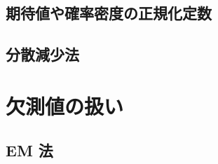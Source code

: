 \subsection{期待値や確率密度の正規化定数}

\subsection{分散減少法}

\section{欠測値の扱い}
\label{sec:stat-missing}



\subsection{EM 法}

\begin{chaptersummary}
\end{chaptersummary}
